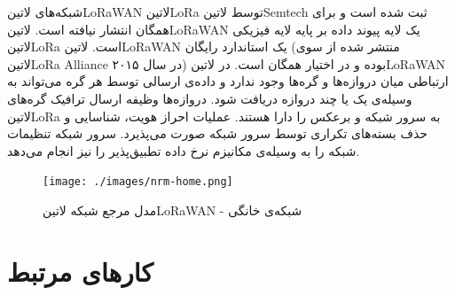 \documentclass[dvipsnames]{beamer}
\begin{document}
\begin{persian}
	\begin{frame}{شبکه‌های ‌لاتین{LoRaWAN}}
		 ‌لاتین{LoRa} توسط ‌لاتین{Semtech} ثبت شده است و برای همگان انتشار نیافته است.
		 ‌لاتین{LoRaWAN} یک لایه پیوند داده بر پایه لایه فیزیکی ‌لاتین{LoRa} است.
		 ‌لاتین{LoRaWAN} یک استاندارد رایگان (منتشر شده از سوی ‌لاتین{LoRa Alliance} در سال ۲۰۱۵) بوده و در اختیار همگان است.
		 در ‌لاتین{LoRaWAN} ارتباطی میان دروازه‌ها و گره‌ها وجود ندارد و داده‌ی ارسالی توسط هر گره می‌تواند به وسیله‌ی یک یا چند دروازه دریافت شود.
		 دروازه‌ها وظیفه ارسال ترافیک گره‌های ‌لاتین{LoRa} به سرور شبکه و برعکس را دارا هستند.
		 عملیات احراز هویت، شناسایی و حذف بسته‌های تکراری توسط سرور شبکه صورت می‌پذیرد.
		 سرور شبکه تنظیمات شبکه را به وسیله‌ی مکانیزم نرخ داده تطبیق‌پذیر را نیز انجام می‌دهد.
	\end{frame}

	\begin{frame}
		\begin{figure}
		\texttt{[image: ./images/nrm-home.png]}
		\centering
		\caption{مدل مرجع شبکه ‌لاتین{LoRaWAN} - شبکه‌ی خانگی}
		\end{figure}
	\end{frame}

	\section{کارهای مرتبط}


\end{persian}
\end{document}
